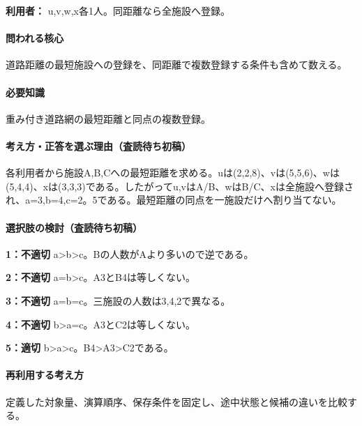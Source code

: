 \noindent\textbf{利用者：} u,v,w,x各1人。同距離なら全施設へ登録。\par

\paragraph{問われる核心} 道路距離の最短施設への登録を、同距離で複数登録する条件も含めて数える。

\paragraph{必要知識} 重み付き道路網の最短距離と同点の複数登録。

\paragraph{考え方・正答を選ぶ理由（査読待ち初稿）} 各利用者から施設A,B,Cへの最短距離を求める。uは(2,2,8)、vは(5,5,6)、wは(5,4,4)、xは(3,3,3)である。したがってu,vはA/B、wはB/C、xは全施設へ登録され、a=\allowbreak{}3,b=\allowbreak{}4,c=\allowbreak{}2。5である。最短距離の同点を一施設だけへ割り当てない。

\paragraph{選択肢の検討（査読待ち初稿）}\mbox{}\par

\noindent\textbf{1：不適切} a>b>c。Bの人数がAより多いので逆である。\par

\noindent\textbf{2：不適切} a=\allowbreak{}b>c。A3とB4は等しくない。\par

\noindent\textbf{3：不適切} a=\allowbreak{}b=\allowbreak{}c。三施設の人数は3,4,2で異なる。\par

\noindent\textbf{4：不適切} b>a=\allowbreak{}c。A3とC2は等しくない。\par

\noindent\textbf{5：適切} b>a>c。B4>A3>C2である。\par

\paragraph{再利用する考え方} 定義した対象量、演算順序、保存条件を固定し、途中状態と候補の違いを比較する。


